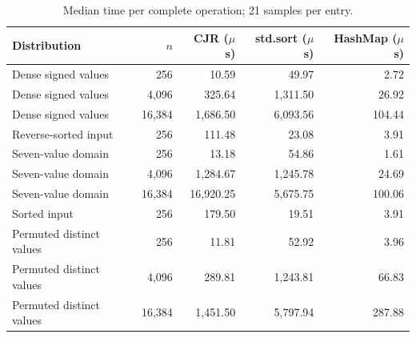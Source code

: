 \begin{table}[H]
\centering\small
\begin{tabular}{lrrrr}
\hline
Distribution & $n$ & CJR ($\mu$s) & std.sort ($\mu$s) & HashMap ($\mu$s) \\
\hline
Dense signed values & 256 & 10.59 & 49.97 & 2.72 \\
Dense signed values & 4,096 & 325.64 & 1,311.50 & 26.92 \\
Dense signed values & 16,384 & 1,686.50 & 6,093.56 & 104.44 \\
Reverse-sorted input & 256 & 111.48 & 23.08 & 3.91 \\
Seven-value domain & 256 & 13.18 & 54.86 & 1.61 \\
Seven-value domain & 4,096 & 1,284.67 & 1,245.78 & 24.69 \\
Seven-value domain & 16,384 & 16,920.25 & 5,675.75 & 100.06 \\
Sorted input & 256 & 179.50 & 19.51 & 3.91 \\
Permuted distinct values & 256 & 11.81 & 52.92 & 3.96 \\
Permuted distinct values & 4,096 & 289.81 & 1,243.81 & 66.83 \\
Permuted distinct values & 16,384 & 1,451.50 & 5,797.94 & 287.88 \\
\hline
\end{tabular}
\caption{Median time per complete operation; 21 samples per entry.}
\end{table}
